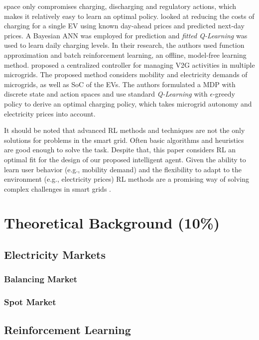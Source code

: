 \documentclass[12pt, article]{article}
\begin{document}
space only compromises charging, discharging and regulatory actions, which makes
it relatively easy to learn an optimal policy.
\textcite{chis16_reinf_learn_based_plug_in} looked at reducing the costs of
charging for a single EV using known day-ahead prices and predicted next-day
prices. A Bayesian ANN was employed for prediction and \emph{fitted Q-Learning} was
used to learn daily charging levels. In their research, the authors used
function approximation and batch reinforcement learning, an offline, model-free
learning method. \textcite{ko18_mobil_aware_vehic_to_grid} proposed a centralized
controller for managing V2G activities in multiple microgrids. The proposed
method considers mobility and electricity demands of microgrids, as well as SoC
of the EVs. The authors formulated a MDP with discrete state and action spaces
and use standard \emph{Q-Learning} with \(\epsilon\)-greedy policy to derive an optimal
charging policy, which takes microgrid autonomy and electricity prices into
account.

It should be noted that advanced RL methods and techniques are not the only
solutions for problems in the smart grid. Often basic algorithms and heuristics
are good enough to solve the task. Despite that, this paper considers RL an
optimal fit for the design of our proposed intelligent agent. Given the ability
to learn user behavior (e.g., mobility demand) and the flexibility to adapt to
the environment (e.g., electricity prices) RL methods are a promising way of
solving complex challenges in smart grids
\parencite{vazquez-canteli19_reinf_learn_deman_respon}.


\section{Theoretical Background (10\%)}
\label{sec:orgedfa37a}
\subsection{Electricity Markets}
\label{sec:orgd20572d}
\subsubsection{Balancing Market}
\label{sec:org168661d}
\subsubsection{Spot Market}
\label{sec:org53af842}
\subsection{Reinforcement Learning \label{reinforcement-learning}}
\label{sec:orgd7d7c0d}
\end{document}
